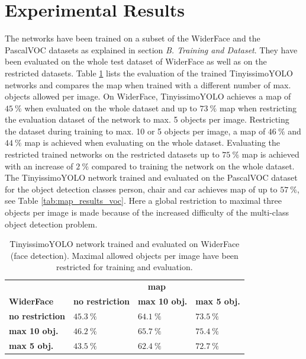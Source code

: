 \documentclass[conference]{IEEEtran}
\newcommand{\ra}[1]{\renewcommand{\arraystretch}{#1}}
\begin{document}
\section{Experimental Results}
The networks have been trained on a subset of the WiderFace \cite{yang_wider_2016} and the PascalVOC datasets as explained in section \textit{B. Training and Dataset}. They have been evaluated on the whole test dataset of WiderFace as well as on the restricted datasets. Table \ref{tab:map_results_wf} 
lists the evaluation of the trained TinyissimoYOLO networks and compares the \gls{map} \cite{everingham_pascal_2015} when trained with a different number of max. objects allowed per image. On WiderFace, TinyissimoYOLO achieves a \gls{map} \cite{everingham_pascal_2015} of $\SI{45}{\percent}$ when evaluated on the whole dataset and up to $\SI{73}{\percent}$ \gls{map} when restricting the evaluation dataset of the network to max. 5 objects per image. Restricting the dataset during training to max. 10 or 5 objects per image, a \gls{map} of $\SI{46}{\percent}$ and $\SI{44}{\percent}$ \gls{map} is achieved when evaluating on the whole dataset. Evaluating the restricted trained networks on the restricted datasets up to $\SI{75}{\percent}$ \gls{map} is achieved with an increase of $\SI{2}{\percent}$ compared to training the network on the whole dataset. The TinyissimoYOLO network trained and evaluated on the PascalVOC dataset for the object detection classes person, chair and car achieves \gls{map} of up to $\SI{57}{\percent}$, see Table \ref{tab:map_results_voc}. Here a global restriction to maximal three objects per image is made because of the increased difficulty of the multi-class object detection problem. 
\vspace{-0.55cm}
\begin{table}[htbp]
    \ra{1.1}
    \caption{TinyissimoYOLO network trained and evaluated on WiderFace (face detection). Maximal allowed objects per image have been restricted for training and evaluation.}
    \begin{center}
    \begin{tabular}{@{}llll@{}}\toprule
         & \multicolumn{3}{c}{\textbf{\gls{map}}} \\
        \cmidrule{2-4}
        \multicolumn{1}{l}{\textbf{WiderFace}} & \textbf{no restriction} &  \textbf{max 10 obj.} & \textbf{max 5 obj.} \\
        \midrule
        \textbf{no restriction} & $\SI{45.3}{\percent}$ & $\SI{64.1}{\percent}$ & $\SI{73.5}{\percent}$ \\
        \textbf{max 10 obj.}  & $\SI{46.2}{\percent}$ & $\SI{65.7}{\percent}$ & $\SI{75.4}{\percent}$ \\
        \textbf{max 5 obj.}   & $\SI{43.5}{\percent}$ & $\SI{62.4}{\percent}$ & $\SI{72.7}{\percent}$ \\
        \bottomrule
        \end{tabular}
    \label{tab:map_results_wf}
    \end{center}
\end{table}
\end{document}
